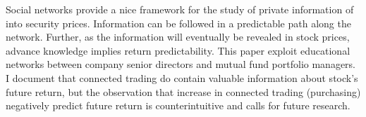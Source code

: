 \documentclass[11pt]{article}
\begin{document}
\begin{doublespace}
Social networks provide a nice framework for the study of private information of into security prices. Information can be followed in a predictable path along the network. Further, as the information will eventually be revealed in stock prices, advance knowledge implies return predictability. This paper exploit educational networks between company senior directors and mutual fund portfolio managers. I document that connected trading do contain valuable information about stock's future return, but the observation that increase in connected trading (purchasing) negatively predict future return is counterintuitive and calls for future research. 


\newpage


\clearpage

\appendix


\end{doublespace}
\end{document}
